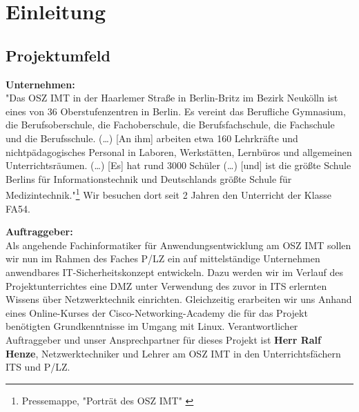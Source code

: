 \section{Einleitung}
\label{sec:Einleitung}

\subsection{Projektumfeld} 
\label{sec:Projektumfeld}
    \textbf{Unternehmen:}\\
    "Das OSZ IMT  in der Haarlemer Straße in Berlin-Britz im Bezirk Neukölln ist eines von 36 Oberstufenzentren in Berlin. 
    Es vereint das Berufliche Gymnasium, die Berufsoberschule, die Fachoberschule, die Berufsfachschule, die Fachschule und die Berufsschule. (\dots)
    [An ihm] arbeiten etwa 160 Lehrkräfte und nichtpädagogisches Personal in Laboren, Werkstätten, Lernbüros und allgemeinen Unterrichtsräumen. (\dots)
    [Es] hat rund 3000 Schüler (\dots) [und] ist die größte Schule Berlins für Informationstechnik und Deutschlands größte Schule für Medizintechnik."\footnote{Pressemappe, "Porträt des OSZ IMT" \citet{Web:2017:www.oszimt.deNoStoparg1}}
    Wir besuchen dort seit 2  Jahren den Unterricht der Klasse \ac{FA54}.
    
    \textbf{Auftraggeber:}\\
    Als angehende Fachinformatiker für Anwendungsentwicklung am OSZ IMT sollen wir nun im Rahmen des Faches \ac{P/LZ} ein auf mittelständige Unternehmen anwendbares IT-Sicherheitskonzept entwickeln. 
    Dazu werden wir im Verlauf des Projektunterrichtes eine \ac{DMZ} unter Verwendung des zuvor in \ac{ITS} erlernten Wissens über Netzwerktechnik einrichten. 
    Gleichzeitig erarbeiten wir uns Anhand eines Online-Kurses der Cisco-Networking-Academy die für das Projekt benötigten Grundkenntnisse im Umgang mit Linux.
    Verantwortlicher Auftraggeber und unser Ansprechpartner für dieses Projekt ist \textbf{Herr Ralf Henze}, Netzwerktechniker und Lehrer am OSZ IMT in den Unterrichtsfächern \ac{ITS} und \ac{P/LZ}.

